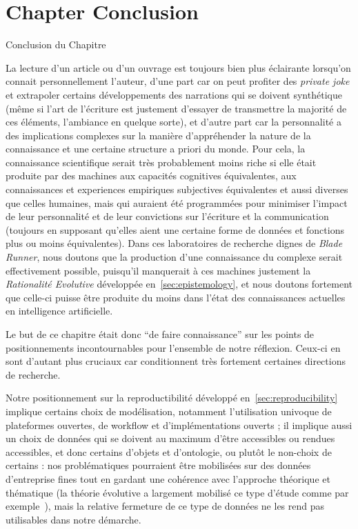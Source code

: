 


\newpage


\section*{Chapter Conclusion}{Conclusion du Chapitre}


La lecture d'un article ou d'un ouvrage est toujours bien plus éclairante lorsqu'on connait personnellement l'auteur, d'une part car on peut profiter des \emph{private joke} et extrapoler certains développements des narrations qui se doivent synthétique (même si l'art de l'écriture est justement d'essayer de transmettre la majorité de ces éléments, l'ambiance en quelque sorte), et d'autre part car la personnalité a des implications complexes sur la manière d'appréhender la nature de la connaissance et une certaine structure a priori du monde. Pour cela, la connaissance scientifique serait très probablement moins riche si elle était produite par des machines aux capacités cognitives équivalentes, aux connaissances et experiences empiriques subjectives équivalentes et aussi diverses que celles humaines, mais qui auraient été programmées pour minimiser l'impact de leur personnalité et de leur convictions sur l'écriture et la communication (toujours en supposant qu'elles aient une certaine forme de données et fonctions plus ou moins équivalentes). Dans ces laboratoires de recherche dignes de \emph{Blade Runner}, nous doutons que la production d'une connaissance du complexe serait effectivement possible, puisqu'il manquerait à ces machines justement la \emph{Rationalité Evolutive} développée en~\ref{sec:epistemology}, et nous doutons fortement que celle-ci puisse être produite du moins dans l'état des connaissances actuelles en intelligence artificielle.

Le but de ce chapitre était donc ``de faire connaissance'' sur les points de positionnements incontournables pour l'ensemble de notre réflexion. Ceux-ci en sont d'autant plus cruciaux car conditionnent très fortement certaines directions de recherche.

Notre positionnement sur la reproductibilité développé en~\ref{sec:reproducibility} implique certains choix de modélisation, notamment l'utilisation univoque de plateformes ouvertes, de workflow et d'implémentations ouverts ; il implique aussi un choix de données qui se doivent au maximum d'être accessibles ou rendues accessibles, et donc certains d'objets et d'ontologie, ou plutôt le non-choix de certains : nos problématiques pourraient être mobilisées sur des données d'entreprise fines tout en gardant une cohérence avec l'approche théorique et thématique (la théorie évolutive a largement mobilisé ce type d'étude comme par exemple~\cite{paulus2004coevolution}), mais la relative fermeture de ce type de données ne les rend pas utilisables dans notre démarche.

